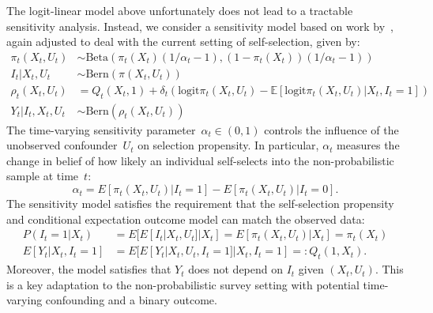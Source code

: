 \documentclass[11pt]{amsart}
\numberwithin{equation}{section}
\theoremstyle{plain}
\def\logit{\text{logit}}
\def\EE{\mathbb{E}}
\begin{document}
The logit-linear model above unfortunately does not lead to a tractable sensitivity analysis.  Instead, we consider a sensitivity model based on work by~\cite{Veitch2020}, again adjusted to deal with the current setting of self-selection, given by:
\begin{equation}
\begin{aligned}
\label{eq:sensmodel}
\pi_t(X_t, U_t) &\sim \text{Beta} \left( \pi_t (X_t) (1/\alpha_t - 1), (1-\pi_t(X_t)) (1/\alpha_t - 1) \right) \\
I_t | X_t, U_t &\sim \text{Bern} (\pi (X_t,U_t)) \\
\rho_t(X_t, U_t) &= Q_t(X_t,1) + \delta_t \left( \logit \pi_t(X_t,U_t) - \EE \left[ \logit \pi_t(X_t,U_t) | X_t, I_t = 1 \right] \right) \\
Y_t | I_t, X_t, U_t &\sim \text{Bern}(\rho_t(X_t, U_t))
\end{aligned}
\end{equation}
The time-varying sensitivity parameter~$\alpha_t \in (0,1)$  controls the influence of the unobserved confounder~$U_t$ on selection propensity. In particular, $\alpha_t$ measures the change in belief of how likely an individual self-selects into the non-probabilistic sample at time~$t$:
$$
\alpha_t = E[ \pi_t (X_t,U_t) | I_t = 1] - E[ \pi_t (X_t,U_t) | I_t = 0].
$$
The sensitivity model satisfies the requirement that the self-selection propensity and conditional expectation outcome model can match the observed data:
\begin{align*}
P(I_t = 1 | X_t ) &= E[ E[ I_t | X_t, U_t ] | X_t ] = E[ \pi_t(X_t, U_t) | X_t ] = \pi_t (X_t) \\
E[Y_t | X_t, I_t = 1 ] &= E[ E[ Y_t | X_t, U_t, I_t =1 ] | X_t, I_t = 1 ] =: Q_t(1,X_t).
\end{align*}
Moreover, the model satisfies that $Y_t$ does not depend on $I_t$ given $(X_t, U_t)$. This is a key adaptation to the non-probabilistic survey setting with potential time-varying confounding and a binary outcome.
\end{document}
